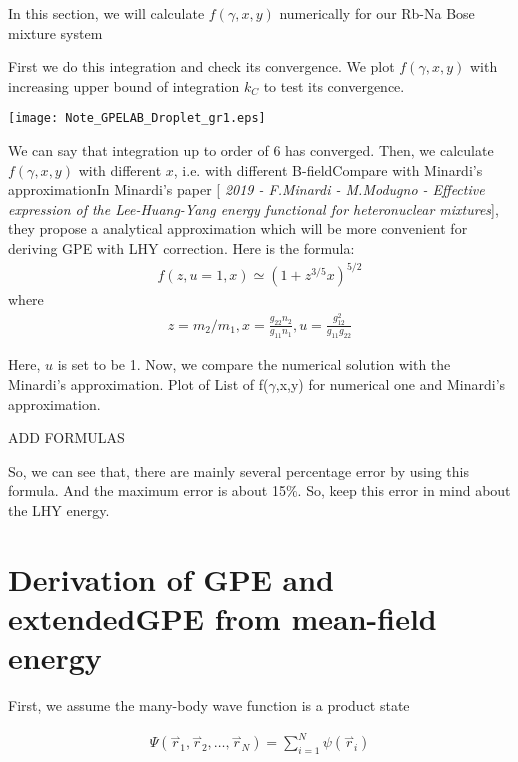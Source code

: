 In this section, we will calculate \(f(\gamma ,x,y)\) numerically for our Rb-Na Bose mixture system

First we do this integration and check its convergence. We plot \(f(\gamma ,x,y)\) with increasing upper bound of integration \(k_C\) to test its
convergence.

\texttt{[image: Note\_GPELAB\_Droplet\_gr1.eps]}

We can say that integration up to order of 6 has converged. 
Then, we calculate \(f(\gamma ,x,y)\) with different \(x\), i.e. with different B-fieldCompare with Minardi{'}s approximationIn Minardi{'}s paper [\textit{ 2019 - F.Minardi - M.Modugno - Effective expression of the Lee-Huang-Yang energy functional for heteronuclear mixtures}], they propose a analytical approximation which will be more convenient for deriving GPE with LHY correction. Here is the formula:
\begin{equation}
\begin{split}
f(z,u=1,x)\simeq \left(1+z^{3/5}x\right)^{5/2}
\end{split}
\end{equation}
where
\begin{equation}
\begin{split}
z=m_2/m_1, x=\frac{g_{22}n_2}{g_{11}n_1},u=\frac{g_{12}^2}{g_{11}g_{22}}
\end{split}
\end{equation}

Here, \(u\) is set to be 1.
Now, we compare the numerical solution with the Minardi{'}s approximation.
Plot of List of f($\gamma $,x,y) for numerical one and Minardi{'}s approximation.

ADD FORMULAS

So, we can see that, there are mainly several percentage error by using this formula. And the maximum error is about 15$\%$. So, keep this error in mind about the LHY energy.

\section{Derivation of GPE and extendedGPE from mean-field energy}

First, we assume the many-body wave function is a product state

\begin{equation}
\begin{split}
\Psi \left(\overset{\rightharpoonup }{r}_1,\overset{\rightharpoonup }{r}_2,\ldots  ,\overset{\rightharpoonup }{r}_N\right)=\sum _{i=1}^N \psi \left(\overset{\rightharpoonup
}{r}_i\right)
\end{split}
\end{equation}

